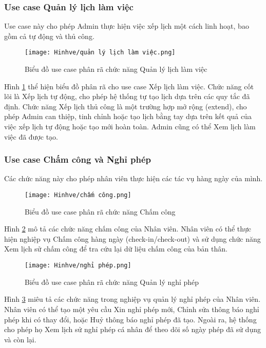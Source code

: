 \documentclass[../DoAn.tex]{subfiles}
\begin{document}
\subsubsection{Use case Quản lý lịch làm việc}
Use case này cho phép Admin thực hiện việc xếp lịch một cách linh hoạt, bao gồm cả tự động và thủ công.

\begin{figure}[H]
    \centering
    \texttt{[image: Hinhve/quản lý lịch làm việc.png]}
    \caption{Biểu đồ use case phân rã chức năng Quản lý lịch làm việc}
    \label{fig:uc_ql_lichlamviec}
\end{figure}
Hình \ref{fig:uc_ql_lichlamviec} thể hiện biểu đồ phân rã cho use case Xếp lịch làm việc. Chức năng cốt lõi là Xếp lịch tự động, cho phép hệ thống tự tạo lịch dựa trên các quy tắc đã định. Chức năng Xếp lịch thủ công là một trường hợp mở rộng (extend), cho phép Admin can thiệp, tinh chỉnh hoặc tạo lịch bằng tay dựa trên kết quả của việc xếp lịch tự động hoặc tạo mới hoàn toàn. Admin cũng có thể Xem lịch làm việc đã được tạo.

\subsubsection{Use case Chấm công và Nghỉ phép}
Các chức năng này cho phép nhân viên thực hiện các tác vụ hàng ngày của mình.
\begin{figure}[H]
    \centering
    \texttt{[image: Hinhve/chấm công.png]}
    \caption{Biểu đồ use case phân rã chức năng Chấm công}
    \label{fig:uc_chamcong}
\end{figure}

Hình \ref{fig:uc_chamcong} mô tả các chức năng chấm công của Nhân viên. Nhân viên có thể thực hiện nghiệp vụ Chấm công hàng ngày (check-in/check-out) và sử dụng chức năng Xem lịch sử chấm công để tra cứu lại dữ liệu chấm công của bản thân.

\begin{figure}[H]
    \centering
    \texttt{[image: Hinhve/nghỉ phép.png]}
    \caption{Biểu đồ use case phân rã chức năng Quản lý nghỉ phép}
    \label{fig:uc_nghiphep}
\end{figure}
Hình \ref{fig:uc_nghiphep} miêu tả các chức năng trong nghiệp vụ quản lý nghỉ phép của Nhân viên. Nhân viên có thể tạo một yêu cầu Xin nghỉ phép mới, Chỉnh sửa thông báo nghỉ phép khi có thay đổi, hoặc Huỷ thông báo nghỉ phép đã tạo. Ngoài ra, hệ thống cho phép họ Xem lịch sử nghỉ phép cá nhân để theo dõi số ngày phép đã sử dụng và còn lại.
\end{document}
